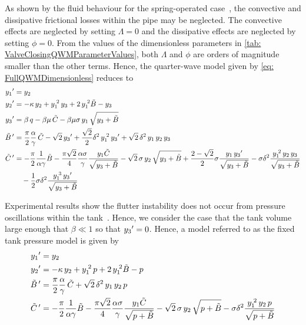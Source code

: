 As shown by the fluid behaviour for the spring-operated case~\cite{Hos2015ModelPipe}, the convective and dissipative frictional losses within the pipe may be neglected. The convective effects are neglected by setting $\Lambda = 0$ and the dissipative effects are neglected by setting $\phi = 0$. From the values of the dimensionless parameters in \cref{tab: ValveClosingQWMParameterValues}, both $\Lambda$ and $\phi$ are orders of magnitude smaller than the other terms. Hence, the quarter-wave model given by \cref{eq: FullQWMDimensionless} reduces to
~
\begin{equation*}
\begin{split}
    \dash{y_1} &= y_2 \\
    \dash{y_2} &= - \kappa \, y_2 + y_1\power{2} \, y_3 + 2 \, y_1\power{2} \tilde{B} - y_3 \\
    \dash{y_3} &= \beta \, q - \beta \mu \, \tilde{C} - \beta \mu \sigma \, y_1 \, \sqrt{y_3 + \tilde{B}} \\
    \dash{\tilde{B}\,} &= \frac{\pi}{2} \frac{\alpha}{\gamma} \, \tilde{C} - \sqrt{2} \, \dash{y_3} + \frac{\sqrt{2}}{2} \delta^2 \, y_1\power{2} \, \dash{y_3} + \sqrt{2} \, \delta^2 \, y_1 \, y_2 \, y_3 \\
    \dash{\tilde{C}\,} &=
    - \frac{\pi}{2} \frac{1}{\alpha \gamma} \tilde{B}
    - \frac{\pi \sqrt{2}}{4} \frac{\alpha \sigma}{\gamma} \frac{y_1 \tilde{C}}{\sqrt{y_3 + \tilde{B}}}
    - \sqrt{2} \, \sigma \, y_2 \, \sqrt{y_3 + \tilde{B}}
    + \frac{2-\sqrt{2}}{2} \sigma \frac{y_1 \, \dash{y_3}}{\sqrt{y_3 + \tilde{B}}}
    - \sigma \delta^2 \frac{y_1\power{2} \, y_2 \, y_3}{\sqrt{y_3 + \tilde{B}}}
    \\ & \quad %
    - \frac{1}{2} \sigma \delta^2 \frac{y_1\power{3} \, \dash{y_3}}{\sqrt{y_3 + \tilde{B}}} 
\end{split}
\end{equation*}

\newpage
Experimental results show the flutter instability does not occur from pressure oscillations within the tank~\cite{Allison2015TestingValves}. Hence, we consider the case that the tank volume large enough that $\beta \ll 1$ so that $y_3{'} = 0$. Hence, a model referred to as the fixed tank pressure model is given by
~
\begin{equation} \label{eq: QWFixedTankPressure}
\begin{split}
    y_1{'} &= y_2 \\
    y_2{'} &= - \kappa \, y_2 + y_1^{\;2} \, p + 2 \, y_1^{\;2} \tilde{B} - p \\
    \tilde{B}\,{'} &= \frac{\pi}{2} \frac{\alpha}{\gamma} \, \tilde{C} + \sqrt{2} \, \delta^2 \, y_1 \, y_2 \, p \\
    \tilde{C}\,{'} &=
    - \frac{\pi}{2} \frac{1}{\alpha \gamma} \tilde{B}
    - \frac{\pi \sqrt{2}}{4} \frac{\alpha \sigma}{\gamma} \frac{y_1 \tilde{C}}{\sqrt{p + \tilde{B}}}
    - \sqrt{2} \, \sigma \, y_2 \, \sqrt{p + \tilde{B}}
    - \sigma \delta^2 \frac{y_1^{\;2} \, y_2 \, p}{\sqrt{p + \tilde{B}}}
\end{split}
\end{equation}

